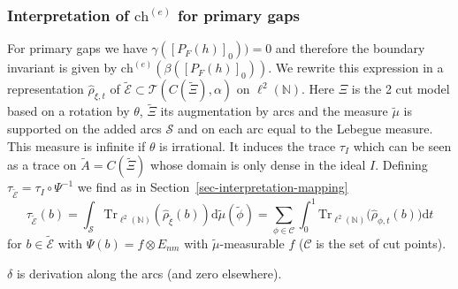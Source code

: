 \documentclass[11pt]{amsart}
\newcommand{\N}{\mathbb{N}}
\newcommand{\che}{\text{ch}^{(e)}}
\begin{document}
\subsubsection{Interpretation of $\che$ for primary gaps}
For primary gaps we have $\gamma([P_F(h)]_0))=0$ and therefore the boundary invariant is given by $\che(\beta([P_F(h)]_0))$. We
rewrite this expression %
in a representation $\hat\rho_{\xi,t}$ of $\tilde{\mathcal E} \subset \mathcal{T}(C(\tilde\Xi),\alpha)$ on $\ell^2(\N)$. 
Here $\Xi$ is the 2 cut model based on a rotation by $\theta$, $\tilde\Xi$ its augmentation by arcs and the measure $\tilde\mu$ is supported on the added arcs $\mathcal S$ and on each arc equal to the Lebegue  measure. This measure is infinite if $\theta$ is irrational. It induces the trace $\tau_{I}$ which can be seen as a trace on $\tilde A=C(\tilde\Xi)$ whose domain is only dense in the ideal $I$. Defining $\tau_{\tilde{\mathcal E}}=\tau_I\circ \Psi^{-1}$ we find as in Section~\ref{sec-interpretation-mapping}
\begin{equation}\label{eq-trace-cute}
\tau_{\tilde{\mathcal E}}(b) = \int_{\mathcal S} \mathrm{Tr}_{\ell^2(\N)}(\hat\rho_{\tilde \xi}(b)) \mathrm{d}\tilde\mu(\tilde\phi)=\sum_{\phi\in{\mathcal C}}\int_0^1
 \mathrm{Tr}_{\ell^2(\N)}\big(\hat\rho_{\phi,t}(b) \big) \mathrm{d} t
 \end{equation}
for $b\in\tilde{\mathcal E}$ with $\Psi(b)=f\otimes E_{nm}$ with $\tilde\mu$-measurable $f$ ($\mathcal C$ is the set of cut points). 

$\delta$ is derivation along the arcs (and zero elsewhere). 
\end{document}
